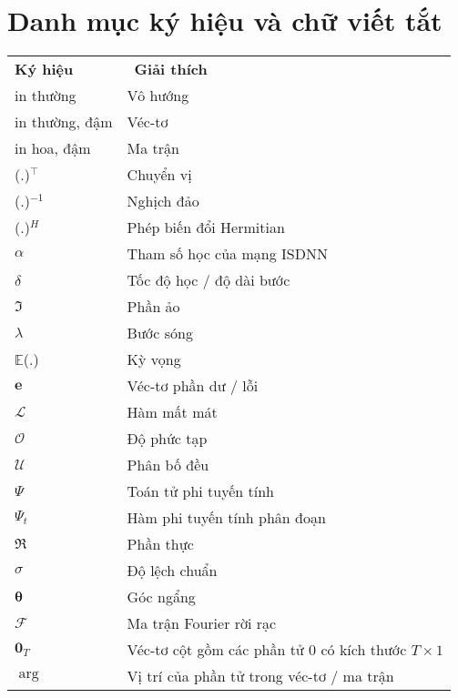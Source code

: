 \clearpage
{}

\chapter*{Danh mục ký hiệu và chữ viết tắt}
{\renewcommand{\arraystretch}{1.4}
{\fontsize{12}{13}\selectfont
\begin{longtable}{|>{\raggedright}p{4.4cm}|p{10.4cm}|}
\hline
\multicolumn{2}{|l|}{\textbf{Danh mục ký hiệu}} \\ 
\hline
\hline
\textbf{Ký hiệu} & ~\textbf{Giải thích}~ \\ 
\hline
in thường & Vô hướng \\ 
\hline
in thường, đậm & Véc-tơ \\ 
\hline
in hoa, đậm & Ma trận \\ 
\hline
(.)$^\top$ & Chuyển vị \\ 
\hline
(.)$^{-1}$ & Nghịch đảo \\ 
\hline
(.)$^H$ & Phép biến đổi Hermitian \\ 
\hline
$\alpha$ & Tham số học của mạng ISDNN \\ 
\hline
$\delta$ & Tốc độ học / độ dài bước \\ 
\hline
$\Im$ & Phần ảo \\ 
\hline
$\lambda$ & Bước sóng \\ 
\hline
$\mathbb{E}$(.) & Kỳ vọng \\ 
\hline
$\mathbf{e}$ & Véc-tơ phần dư / lỗi \\ 
\hline
$\mathcal{L}$ & Hàm mất mát \\ 
\hline
$\mathcal{O}$ & Độ phức tạp \\ 
\hline
$\mathcal{U}$ & Phân bố đều \\ 
\hline
$\Psi$ & Toán tử phi tuyến tính \\ 
\hline
$\Psi_t$ & Hàm phi tuyến tính phân đoạn \\ 
\hline
$\Re$ & Phần thực \\ 
\hline
$\sigma$ & Độ lệch chuẩn \\ 
\hline
$\mathbf{\theta}$ & Góc ngẩng \\ 
\hline
$\mathcal{F}$ & Ma trận Fourier rời rạc \\ 
\hline
$\mathbf{0}_T$ & Véc-tơ cột gồm các phần tử $0$ có kích thước $T \times 1$ \\ 
\hline
$\operatorname{arg}$ & Vị trí của phần tử trong véc-tơ / ma trận \\ 
\hline

\end{longtable}}}
